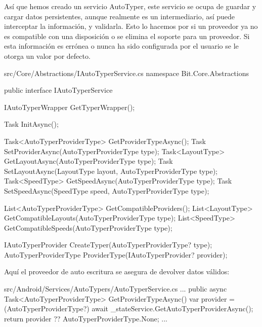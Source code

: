 Así que hemos creado un servicio AutoTyper, este servicio se ocupa de guardar y cargar datos persistentes, aunque realmente es un intermediario, así puede interceptar la información, y validarla. Esto lo hacemos por si un proveedor ya no es compatible con una disposición o se elimina el soporte para un proveedor. Si esta información es errónea o nunca ha sido configurada por el usuario se le otorga un valor por defecto.

\begin{csharp}[firstnumber=7]{src/Core/Abstractions/IAutoTyperService.cs}
namespace Bit.Core.Abstractions
{
    public interface IAutoTyperService
    {
        IAutoTyperWrapper GetTyperWrapper();

        Task InitAsync();

        Task<AutoTyperProviderType> GetProviderTypeAsync();
        Task SetProviderAsync(AutoTyperProviderType type);
        Task<LayoutType> GetLayoutAsync(AutoTyperProviderType type);
        Task SetLayoutAsync(LayoutType layout, AutoTyperProviderType type);
        Task<SpeedType> GetSpeedAsync(AutoTyperProviderType type);
        Task SetSpeedAsync(SpeedType speed, AutoTyperProviderType type);

        List<AutoTyperProviderType> GetCompatibleProviders();
        List<LayoutType> GetCompatibleLayouts(AutoTyperProviderType type);
        List<SpeedType> GetCompatibleSpeeds(AutoTyperProviderType type);

        IAutoTyperProvider CreateTyper(AutoTyperProviderType? type);
        AutoTyperProviderType ProviderType(IAutoTyperProvider? provider);
    }
}
\end{csharp}

Aquí el proveedor de auto escritura se asegura de devolver datos válidos:
\begin{csharp}[firstnumber=32]{src/Android/Services/AutoTypers/AutoTyperService.cs}
...
    public async Task<AutoTyperProviderType> GetProviderTypeAsync()
    {
        var provider = (AutoTyperProviderType?) await _stateService.GetAutoTyperProviderAsync();
        return provider ?? AutoTyperProviderType.None;
    }
...
\end{csharp}

